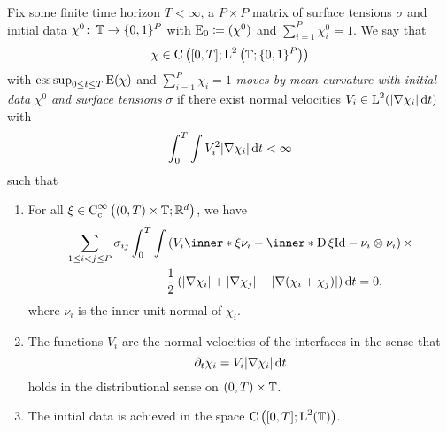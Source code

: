 \begin{definition}
	\label{motion_by_mmcf}
	Fix some finite time horizon $ T < \infty $, a $ P \times P $ matrix of surface tensions $ \sigma $ and initial data $ \chi^{ 0 } \colon \operatorname{\mathbb{T}} \to \{ 0 , 1 \}^{ P } $ with $ \operatorname{E}_{ 0 } \coloneqq ( \chi^{ 0 } ) $ and $ \sum_{ i = 1 }^{ P } \chi_{ i }^{ 0 } = 1 $. We say that
	\begin{equation*}
		\chi \in \operatorname{C} \left(
			[ 0 , T ]
			;
			\operatorname{L}^{ 2 } \left( \operatorname{\mathbb{T}} ; \{ 0 , 1 \}^{ P } \right)
		\right)
	\end{equation*}
	with $ \operatorname*{ess\,sup}_{ 0 \leq t \leq T } \operatorname{E} ( \chi ) $ and $ \sum_{ i = 1 
	}^{ P } \chi_{ i } = 1 $ \emph{moves by mean curvature with initial data} $ 
	\chi^{ 0 } $ \emph{and surface tensions} $ \sigma $ if there exist normal 
	velocities $ V_{ i } \in \operatorname{L}^{ 2 } ( \abs{ \nabla \chi_{ i } } \dd{ t } ) $ 
	with
	\begin{equation*}
		\int_{ 0 }^{ T }
			\int
				V_{ i }^{ 2 }
			\abs{ \nabla \chi_{ i } }
		\dd{ t }
		< \infty 
	\end{equation*} 
	such that
	\begin{enumerate}
		\item For all 
		$ \xi \in \operatorname{C}_{ \mathrm{c} }^{ \infty } \left(
			( 0 , T ) \times \operatorname{\mathbb{T}} ; \mathbb{ R }^{ d }
		\right)
		$, we have 
		\begin{align}
			\label{distributional_equation_mmcf}
			\sum_{ 1 \leq i < j \leq P }
				\sigma_{ i j }
				\int_{ 0 }^{ T }
					\int
						&
						\left(
							V_{ i } \inner*{ \xi }{ \nu_{ i } }
							-
							\inner*{ \diff \xi }{ \mathrm{Id} - \nu_{ i } \otimes \nu_{ i } }
						\right)
						\times
					\\
				\notag
					& \frac{1}{ 2 }
					\left(
						\abs{ \nabla \chi_{ i } }
						+
						\abs{ \nabla \chi_{ j } }
						-
						\abs{ \nabla ( \chi_{ i } + \chi_{ j } ) }
					\right)
				\dd{ t }
			=0,			
		\end{align}
		where $ \nu_{ i } $ is the inner unit normal of $ \chi_{ i } $.
		
		\item 
		The functions $ V_{ i } $ are the normal velocities of the interfaces in the sense that
		\begin{equation*}
			\partial_{ t } \chi_{ i }
			=
			V_{ i } \abs{ \nabla \chi_{ i } } \dd{ t }
		\end{equation*}
		holds in the distributional sense on $ ( 0 , T ) \times \operatorname{\mathbb{T}} $.
		
		\item
		The initial data is achieved in the space $ \operatorname{C} \left( [ 0 , T ] ; \operatorname{L}^{ 2 } ( \operatorname{\mathbb{T}} ) \right) $.
	\end{enumerate}
\end{definition}

